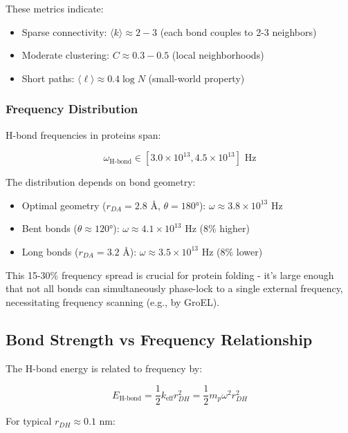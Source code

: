 These metrics indicate:
\begin{itemize}
\item Sparse connectivity: $\langle k \rangle \approx 2-3$ (each bond couples to 2-3 neighbors)
\item Moderate clustering: $C \approx 0.3-0.5$ (local neighborhoods)
\item Short paths: $\langle \ell \rangle \approx 0.4 \log N$ (small-world property)
\end{itemize}

\subsubsection{Frequency Distribution}

H-bond frequencies in proteins span:

\begin{equation}
\omega_{\text{H-bond}} \in [3.0 \times 10^{13}, 4.5 \times 10^{13}] \text{ Hz}
\end{equation}

The distribution depends on bond geometry:
\begin{itemize}
\item Optimal geometry ($r_{DA} = 2.8$ Å, $\theta = 180°$): $\omega \approx 3.8 \times 10^{13}$ Hz
\item Bent bonds ($\theta \approx 120°$): $\omega \approx 4.1 \times 10^{13}$ Hz (8\% higher)
\item Long bonds ($r_{DA} = 3.2$ Å): $\omega \approx 3.5 \times 10^{13}$ Hz (8\% lower)
\end{itemize}

This 15-30\% frequency spread is crucial for protein folding - it's large enough that not all bonds can simultaneously phase-lock to a single external frequency, necessitating frequency scanning (e.g., by GroEL).

\subsection{Bond Strength vs Frequency Relationship}

The H-bond energy is related to frequency by:

\begin{equation}
E_{\text{H-bond}} = \frac{1}{2}k_{\text{eff}}r_{DH}^2 = \frac{1}{2}m_p\omega^2 r_{DH}^2
\end{equation}

For typical $r_{DH} \approx 0.1$ nm:

